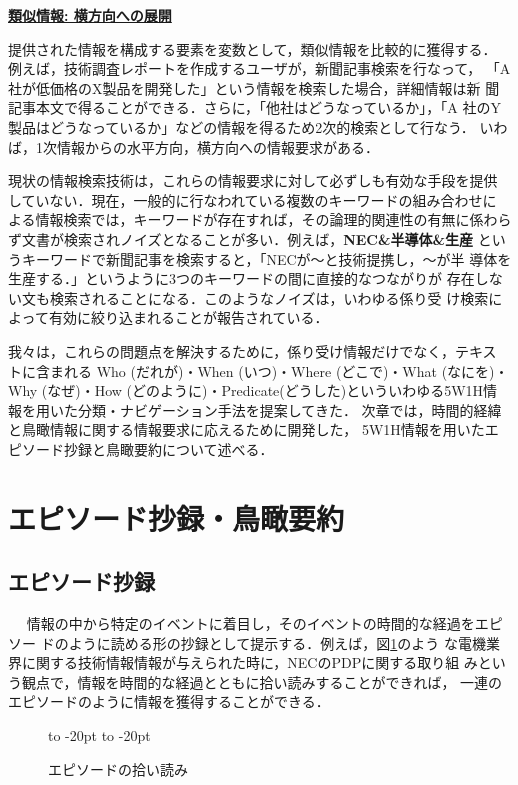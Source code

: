 \noindent\underline{\bf 類似情報:  横方向への展開}

提供された情報を構成する要素を変数として，類似情報を比較的に獲得する．
例えば，技術調査レポートを作成するユーザが，新聞記事検索を行なって，
「A社が低価格のX製品を開発した」という情報を検索した場合，詳細情報は新
聞記事本文で得ることができる．さらに，「他社はどうなっているか」，「A
社のY製品はどうなっているか」などの情報を得るため2次的検索として行なう．
いわば，1次情報からの水平方向，横方向への情報要求がある．

現状の情報検索技術は，これらの情報要求に対して必ずしも有効な手段を提供
していない．現在，一般的に行なわれている複数のキーワードの組み合わせに
よる情報検索では，キーワードが存在すれば，その論理的関連性の有無に係わら
ず文書が検索されノイズとなることが多い．例えば，{\bf NEC\&半導体\&生産} 
というキーワードで新聞記事を検索すると，「NECが〜と技術提携し，〜が半
導体を生産する．」というように3つのキーワードの間に直接的なつながりが
存在しない文も検索されることになる．このようなノイズは，いわゆる係り受
け検索によって有効に絞り込まれることが報告されている\cite{mine}．

我々は，これらの問題点を解決するために，係り受け情報だけでなく，テキス
トに含まれる Who (だれが)・When (いつ)・Where (どこで)・What (なにを)・
Why (なぜ)・How (どのように)・Predicate(どうした)といういわゆる5W1H情
報を用いた分類・ナビゲーション手法を提案してきた\cite{IAM97,ikeda98}．
次章では，時間的経緯と鳥瞰情報に関する情報要求に応えるために開発した，
5W1H情報を用いたエピソード抄録と鳥瞰要約について述べる．

\section{エピソード抄録・鳥瞰要約}

\subsection{エピソード抄録}　
\vspace{-0.0cm}
情報の中から特定のイベントに着目し，そのイベントの時間的な経過をエピソー
ドのように読める形の抄録として提示する．例えば，図\ref{episode1}のよう
な電機業界に関する技術情報情報が与えられた時に，NECのPDPに関する取り組
みという観点で，情報を時間的な経過とともに拾い読みすることができれば，
一連のエピソードのように情報を獲得することができる．

\begin{figure}[tbp]
  \vspace*{-6pt}
 \begin{center}
    \leavevmode
    \hbox to -20pt{\hss}
    \hbox to -20pt{\hss}
    \caption{エピソードの拾い読み}
 
    \label{episode1}
  \end{center}
\end{figure}

